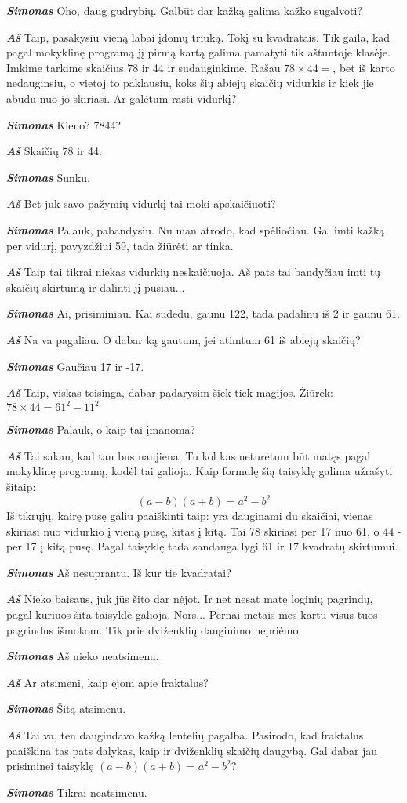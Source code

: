 \documentclass[a4paper]{article}
\newcommand{\say}[1]{\textbf{\textit{#1}}}
\begin{document}
\say{Simonas} Oho, daug gudrybių. Galbūt dar kažką galima kažko sugalvoti?

\say{Aš} Taip, pasakysiu vieną labai įdomų triuką. Tokį su kvadratais. Tik gaila, kad pagal mokyklinę programą jį pirmą kartą galima pamatyti tik aštuntoje klasėje. Imkime tarkime skaičius 78 ir 44 ir sudauginkime. Rašau $78 \times 44 =$, bet iš karto nedauginsiu, o vietoj to paklausiu, koks šių abiejų skaičių vidurkis ir kiek jie abudu nuo jo skiriasi. Ar galėtum rasti vidurkį?

\say{Simonas} Kieno? 7844?

\say{Aš} Skaičių 78 ir 44.

\say{Simonas} Sunku.

\say{Aš} Bet juk savo pažymių vidurkį tai moki apskaičiuoti?

\say{Simonas} Palauk, pabandysiu. Nu man atrodo, kad spėliočiau. Gal imti kažką per vidurį, pavyzdžiui 59, tada žiūrėti ar tinka.

\say{Aš} Taip tai tikrai niekas vidurkių neskaičiuoja. Aš pats tai bandyčiau imti tų skaičių skirtumą ir dalinti jį pusiau...

\say{Simonas} Ai, prisiminiau. Kai sudedu, gaunu 122, tada padalinu iš 2 ir gaunu 61.

\say{Aš} Na va pagaliau. O dabar ką gautum, jei atimtum 61 iš abiejų skaičių?

\say{Simonas} Gaučiau 17 ir -17.

\say{Aš} Taip, viskas teisinga, dabar padarysim šiek tiek magijos. Žiūrėk: $78 \times 44 = 61^2 - 11^2$

\say{Simonas} Palauk, o kaip tai įmanoma?

\say{Aš} Tai sakau, kad tau bus naujiena. Tu kol kas neturėtum būt matęs pagal mokyklinę programą, kodėl tai galioja. Kaip formulę šią taisyklę galima užrašyti šitaip: $$(a-b)(a+b) = a^2 - b^2$$ Iš tikrųjų, kairę pusę galiu paaiškinti taip: yra dauginami du skaičiai, vienas skiriasi nuo vidurkio į vieną pusę, kitas į kitą. Tai 78 skiriasi per 17 nuo 61, o 44 - per 17 į kitą pusę. Pagal taisyklę tada sandauga lygi 61 ir 17 kvadratų skirtumui.

\say{Simonas} Aš nesuprantu. Iš kur tie kvadratai?

\say{Aš} Nieko baisaus, juk jūs šito dar nėjot. Ir net nesat matę loginių pagrindų, pagal kuriuos šita taisyklė galioja. Nors... Pernai metais mes kartu visus tuos pagrindus išmokom. Tik prie dviženklių dauginimo nepriėmo.

\say{Simonas} Aš nieko neatsimenu.

\say{Aš} Ar atsimeni, kaip ėjom apie fraktalus?

\say{Simonas} Šitą atsimenu. 

\say{Aš} Tai va, ten daugindavo kažką lentelių pagalba. Pasirodo, kad fraktalus paaiškina tas pats dalykas, kaip ir dviženklių skaičių daugybą. Gal dabar jau prisiminei taisyklę $(a-b)(a+b) = a^2 - b^2$?

\say{Simonas} Tikrai neatsimenu. 
\end{document}
